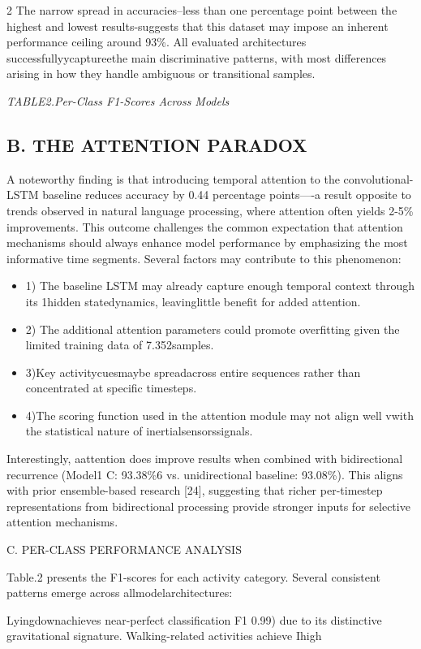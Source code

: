 \documentclass{article}
\begin{document}
\begin{paracol}{2}
The narrow spread in accuracies--less than one
percentage point between the highest and lowest results-suggests that this dataset may impose
an inherent performance ceiling around 93\%. All
evaluated architectures successfullyycaptureethe
main discriminative patterns, with most differences
arising in how they handle ambiguous or transitional samples.

\switchcolumn
\RaggedRight

\textit{TABLE2.Per-Class F1-Scores Across Models}


\subsection*{B. THE ATTENTION PARADOX}


A noteworthy finding is that introducing temporal
attention to the convolutional-LSTM baseline reduces accuracy by 0.44 percentage points—-a result
opposite to trends observed in natural language
processing, where attention often yields 2-5\% improvements. This outcome challenges the common
expectation that attention mechanisms should always enhance model performance by emphasizing
the most informative time segments. Several factors may contribute to this phenomenon:

\begin{itemize}
\item 1) The baseline LSTM may already capture
enough temporal context through its 1hidden statedynamics, leavinglittle benefit for
added attention.

\item 2) The additional attention parameters could
 promote overfitting given the limited training
data of 7.352samples.

\item 3)Key activitycuesmaybe spreadacross entire
sequences rather than concentrated at specific
timesteps.

\item 4)The scoring function used in the attention
module may  not align well vwith the statistical
nature of inertialsensorssignals.

\end{itemize}

Interestingly, aattention does improve results
when  combined  with bidirectional recurrence
(Model1 C:  93.38\%6 vs. unidirectional baseline:
93.08\%). This aligns with prior ensemble-based
research [24], suggesting that richer per-timestep
representations from bidirectional processing provide stronger inputs for selective attention mechanisms.


C. PER-CLASS PERFORMANCE ANALYSIS


Table.2 presents the F1-scores for each activity
category. Several consistent patterns emerge across
allmodelarchitectures:


Lyingdownachieves near-perfect classification
F1 0.99) due to its distinctive gravitational
signature. Walking-related activities achieve Ihigh

\end{paracol}
\end{document}

